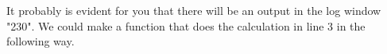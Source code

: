 It probably is evident for you that there will be an output in the log window "230". We could make a function that does the calculation in line 3 in the following way.